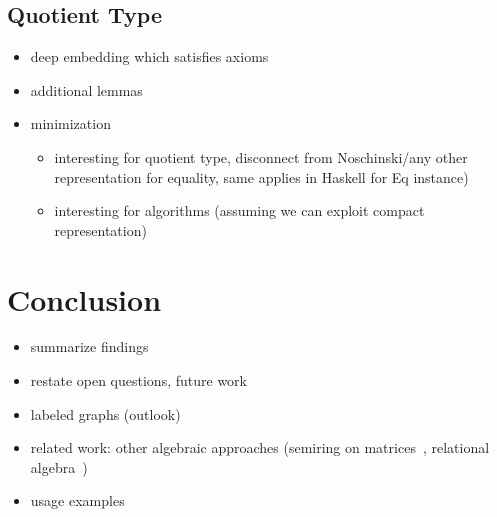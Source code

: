 \documentclass{article}
\begin{document}
\subsection{Quotient Type}
\begin{itemize}
\item deep embedding which satisfies axioms
\item additional lemmas
\item minimization~\cite{mcconnell2005linear}
  \begin{itemize}
  \item interesting for quotient type, disconnect from Noschinski/any other
    representation for equality, same applies in Haskell for Eq instance)
    \item interesting for algorithms (assuming we can exploit compact
      representation)
    \end{itemize}
\end{itemize}

\section{Conclusion}
\begin{itemize}
\item summarize findings
\item restate open questions, future work
\item labeled graphs (outlook)
\item related work: other algebraic approaches (semiring on
  matrices~\cite{dolan2013fun}, relational
  algebra~\cite{berghammer2020relational})
\item usage examples~\cite{mokhov2019language,beaumont2017high}
\end{itemize}
\printbibliography
\end{document}
